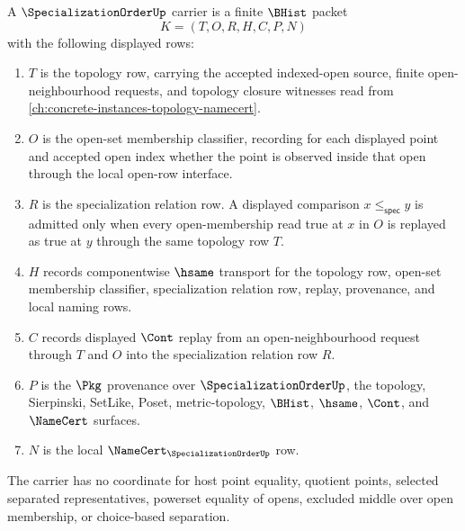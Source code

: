 \begin{definition}
\label{def:specialization-order-carrier}
A $\SpecializationOrderUp$ carrier is a finite $\BHist$ packet
$$
K=(T,O,R,H,C,P,N)
$$
with the following displayed rows:
\begin{enumerate}
\item $T$ is the topology row, carrying the accepted indexed-open source, finite open-neighbourhood requests, and topology closure witnesses read from \autoref{ch:concrete-instances-topology-namecert}.
\item $O$ is the open-set membership classifier, recording for each displayed point and accepted open index whether the point is observed inside that open through the local open-row interface.
\item $R$ is the specialization relation row. A displayed comparison $x \leq_{\mathsf{spec}} y$ is admitted only when every open-membership read true at $x$ in $O$ is replayed as true at $y$ through the same topology row $T$.
\item $H$ records componentwise $\hsame$ transport for the topology row, open-set membership classifier, specialization relation row, replay, provenance, and local naming rows.
\item $C$ records displayed $\Cont$ replay from an open-neighbourhood request through $T$ and $O$ into the specialization relation row $R$.
\item $P$ is the $\Pkg$ provenance over $\SpecializationOrderUp$, the topology, Sierpinski, SetLike, Poset, metric-topology, $\BHist$, $\hsame$, $\Cont$, and $\NameCert$ surfaces.
\item $N$ is the local $\NameCert_{\SpecializationOrderUp}$ row.
\end{enumerate}
The carrier has no coordinate for host point equality, quotient points, selected separated representatives, powerset equality of opens, excluded middle over open membership, or choice-based separation.
\end{definition}

